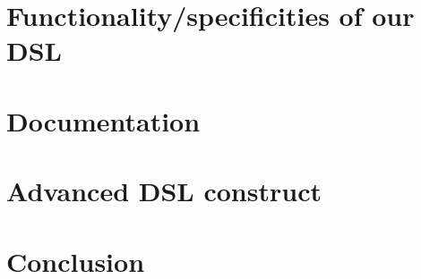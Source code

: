 





\section{Functionality/specificities of our DSL}

\section{Documentation}

\section{Advanced DSL construct}

\section{Conclusion}



